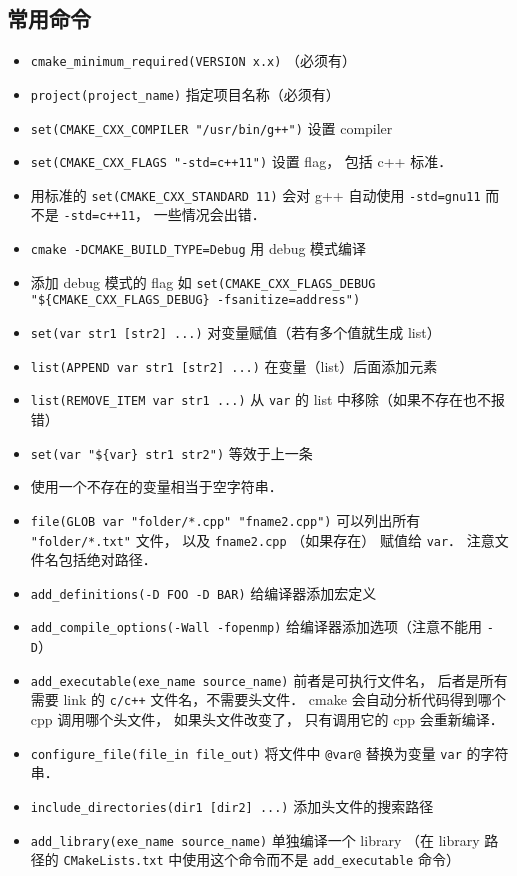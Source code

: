 \subsection{常用命令}
\begin{itemize}
\item \verb`cmake_minimum_required(VERSION x.x)` （必须有）
\item \verb`project(project_name)` 指定项目名称（必须有）
\item \verb|set(CMAKE_CXX_COMPILER "/usr/bin/g++")| 设置 compiler
\item \verb|set(CMAKE_CXX_FLAGS "-std=c++11")| 设置 flag， 包括 c++ 标准．
\item 用标准的 \verb|set(CMAKE_CXX_STANDARD 11)| 会对 g++ 自动使用 \verb|-std=gnu11| 而不是 \verb|-std=c++11|， 一些情况会出错．
\item \verb|cmake -DCMAKE_BUILD_TYPE=Debug| 用 debug 模式编译
\item 添加 debug 模式的 flag 如 \verb|set(CMAKE_CXX_FLAGS_DEBUG "${CMAKE_CXX_FLAGS_DEBUG} -fsanitize=address")|
\item \verb`set(var str1 [str2] ...)` 对变量赋值（若有多个值就生成 list）
\item \verb`list(APPEND var str1 [str2] ...)` 在变量（list）后面添加元素
\item \verb|list(REMOVE_ITEM var str1 ...)| 从 \verb|var| 的 list 中移除（如果不存在也不报错）
\item \verb|set(var "${var} str1 str2")| 等效于上一条
\item 使用一个不存在的变量相当于空字符串．
\item \verb`file(GLOB var "folder/*.cpp" "fname2.cpp")` 可以列出所有 \verb|"folder/*.txt"| 文件， 以及 \verb|fname2.cpp| （如果存在） 赋值给 \verb|var|． 注意文件名包括绝对路径．
\item \verb|add_definitions(-D FOO -D BAR)| 给编译器添加宏定义
\item \verb|add_compile_options(-Wall -fopenmp)| 给编译器添加选项（注意不能用 \verb|-D|）
\item \verb`add_executable(exe_name source_name)` 前者是可执行文件名， 后者是所有需要 link 的 \verb|c/c++| 文件名，不需要头文件． cmake 会自动分析代码得到哪个 cpp 调用哪个头文件， 如果头文件改变了， 只有调用它的 cpp 会重新编译．
\item \verb`configure_file(file_in file_out)` 将文件中 \verb`@var@` 替换为变量 \verb`var` 的字符串．
\item \verb`include_directories(dir1 [dir2] ...)` 添加头文件的搜索路径
\item \verb`add_library(exe_name source_name)` 单独编译一个 library （在 library 路径的 \verb|CMakeLists.txt| 中使用这个命令而不是 \verb`add_executable` 命令）

\end{itemize}
